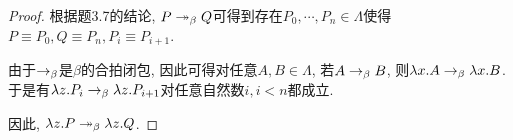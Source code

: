 \begin{proof}
    根据题3.7的结论, $P\twoheadrightarrow_{\beta} Q$可得到存在$P_0,\cdots,P_n\in\Lambda$使得$P\equiv P_0,Q\equiv P_n, P_i\equiv P_{i+1}$.
	
	由于$\rightarrow_{\beta}$是$\beta$的合拍闭包, 因此可得对任意$A, B\in\Lambda$, 若$A\rightarrow_{\beta} B$, 则$\lambda x.A\rightarrow_{\beta}\lambda x.B$. 于是有$\lambda z.P_i\rightarrow_{\beta}\lambda z.P_{i+1}$对任意自然数$i, i<n$都成立.
	
	因此, $\lambda z.P\twoheadrightarrow_{\beta}\lambda z.Q$.
\end{proof}